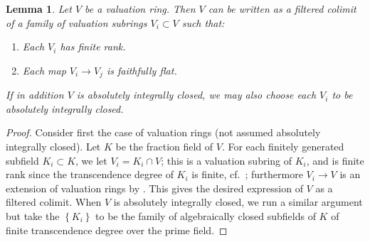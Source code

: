 \documentclass[reqno]{amsart}
\newtheorem{lemma}[theorem]{Lemma}
\theoremstyle{definition}
\begin{document}
\begin{lemma} 
\label{filtcolimitaic}
Let $V$ be  a valuation ring. Then $V$ can be written as a filtered colimit of a family of valuation subrings
$V_i \subset V$ such that: 
\begin{enumerate}
\item Each $V_i$ has finite rank.  
\item Each map $V_i \to V_j$ is faithfully flat. 
\end{enumerate}
If in addition $V$ is absolutely integrally closed, we may also choose each $V_i$ to be absolutely integrally closed. 
\end{lemma} 
\begin{proof} 
Consider first the case of valuation rings (not assumed absolutely integrally closed). 
Let $K$ be the  fraction field of $V$. 
For each finitely generated subfield $K_i \subset K$, we let $V_i = K_i \cap V$;
this is a valuation subring of $K_i$, and is finite rank since the
transcendence degree of $K_i$ is finite, cf.~\cite[Theorem
VI.10.3.1]{BourbakiCA}; furthermore $V_i \to V$ is an extension of valuation
rings by . 
This gives the desired expression of $V$ as a filtered colimit. When $V$ is absolutely integrally closed,
we run a similar argument but take the $\left\{K_i\right\}$ to be the family of
algebraically closed subfields of $K$ of finite transcendence degree over the
prime field. 
\end{proof} 
\end{document}
